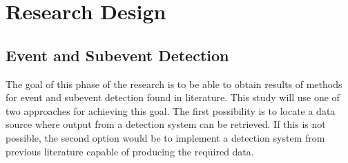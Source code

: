 \documentclass[conference]{IEEEtran}
\begin{document}
%



\section{Research Design}
\subsection {Event and Subevent Detection}
The goal of this phase of the research is to be able to obtain results of methods for event and subevent detection found in literature. This study will use one of two approaches for achieving this goal. The first possibility is to locate a data source where output from a detection system can be retrieved. If this is not possible, the second option would be to implement a detection system from previous literature capable of producing the required data.
\end{document}
